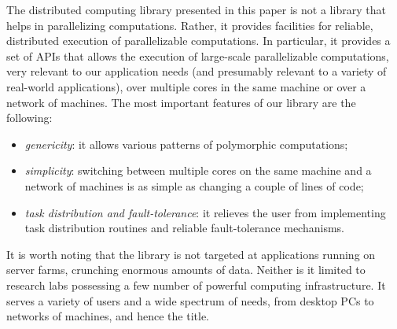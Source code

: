 \documentclass[preprint]{sigplanconf}
\begin{document}
The distributed computing library presented in this paper is not a
library that helps in parallelizing computations. Rather, it provides
facilities for reliable, distributed execution of parallelizable
computations. In particular, it provides a set of APIs that allows the
execution of large-scale parallelizable computations, very relevant to
our application needs (and presumably relevant to a variety of
real-world applications), over multiple cores in the same machine or
over a network of machines. 
The most important features of our library are the following:
\begin{itemize}
\item \emph{genericity}: 
  it allows various patterns of polymorphic computations;
\item \emph{simplicity}: switching between multiple cores on the same
  machine and a network of machines is as simple as changing a couple
  of lines of code;
\item \emph{task distribution and fault-tolerance}: 
  it relieves the user from implementing task distribution routines
  and reliable fault-tolerance mechanisms.
\end{itemize}
It is worth noting that the library is not targeted at applications
running on server farms, crunching enormous amounts of data. Neither
is it limited to research labs possessing a few number of powerful
computing infrastructure. It serves a variety of users and a wide
spectrum of needs, from desktop PCs to networks of machines, and hence
the title.
\end{document}
